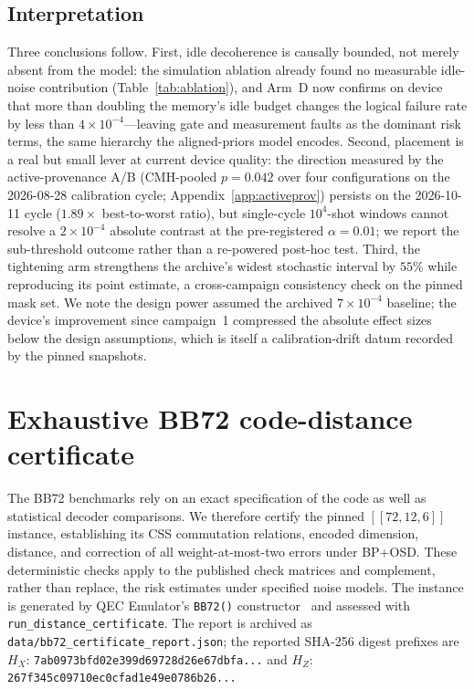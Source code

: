 \documentclass[pdflatex,sn-mathphys-num]{sn-jnl}
\theoremstyle{thmstyleone}
\theoremstyle{thmstyletwo}
\theoremstyle{thmstylethree}
\begin{document}
\subsection{Interpretation}

Three conclusions follow. First, idle decoherence is causally bounded, not merely absent from the model: the simulation ablation already found no measurable idle-noise contribution (Table~\ref{tab:ablation}), and Arm~D now confirms on device that more than doubling the memory's idle budget changes the logical failure rate by less than $4\times10^{-4}$---leaving gate and measurement faults as the dominant risk terms, the same hierarchy the aligned-priors model encodes. Second, placement is a real but small lever at current device quality: the direction measured by the active-provenance A/B (CMH-pooled $p=0.042$ over four configurations on the 2026-08-28 calibration cycle; Appendix~\ref{app:activeprov}) persists on the 2026-10-11 cycle ($1.89\times$ best-to-worst ratio), but single-cycle $10^{4}$-shot windows cannot resolve a $2\times10^{-4}$ absolute contrast at the pre-registered $\alpha=0.01$; we report the sub-threshold outcome rather than a re-powered post-hoc test. Third, the tightening arm strengthens the archive's widest stochastic interval by $55\%$ while reproducing its point estimate, a cross-campaign consistency check on the pinned mask set. We note the design power assumed the archived $7\times10^{-4}$ baseline; the device's improvement since campaign~1 compressed the absolute effect sizes below the design assumptions, which is itself a calibration-drift datum recorded by the pinned snapshots.

\section{Exhaustive BB72 code-distance certificate}
\label{sec:cert}

The BB72 benchmarks rely on an exact specification of the code as well as statistical decoder comparisons. We therefore certify the pinned $[[72,12,6]]$ instance, establishing its CSS commutation relations, encoded dimension, distance, and correction of all weight-at-most-two errors under BP+OSD. These deterministic checks apply to the published check matrices and complement, rather than replace, the risk estimates under specified noise models. The instance is generated by QEC Emulator's \texttt{BB72()} constructor~\cite{AlDaajeh2026emulator} and assessed with \texttt{run\_distance\_certificate}. The report is archived as \texttt{data/bb72\_certificate\_report.json}; the reported SHA-256 digest prefixes are $H_X$: \texttt{7ab0973bfd02e399d69728d26e67dbfa...} and $H_Z$: \texttt{267f345c09710ec0cfad1e49e0786b26...}
\end{document}
